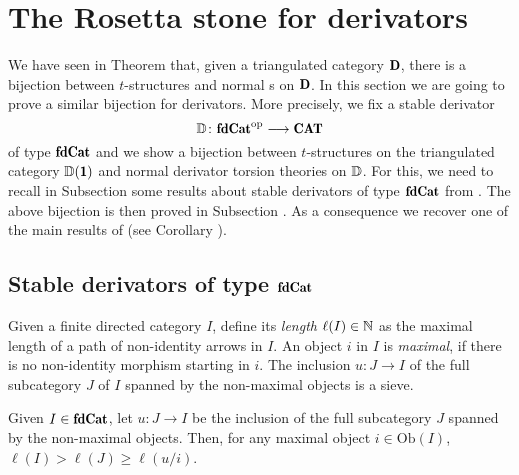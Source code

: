 \section{The Rosetta stone for derivators}
We have seen in Theorem  that, given a triangulated category $\cD$, there is a bijection between $t$-structures and normal {\htth}s on $\cD$. In this section we are going to prove a similar bijection for derivators. More precisely, we fix a stable derivator 
$$\D\colon \fincat^\opp\longrightarrow \Cat$$
of type $\fincat$ and we show a bijection between $t$-structures on the triangulated category $\D(\uno)$ and normal derivator torsion theories on $\mathbb{D}$. For this, we need to recall in Subsection  some results about stable derivators of type $\fincat$ from \cite{Groth_Virili}. The above bijection is then proved in Subsection . As a consequence we recover one of the main results of \cite{Fiorenza2014} (see Corollary ). 

\subsection{Stable derivators of type $\fincat$}\label{recall_fincat}

Given a finite directed category $I$, define its \emph{length} $\ell(I)\in \mathbb{N}$ as the maximal length of a path of non-identity arrows in $I$. An object $i$ in $I$ is \emph{maximal}, if there is no non-identity morphism starting in $i$. The inclusion $u\colon J\to I$ of the full subcategory $J$ of $I$ spanned by the non-maximal objects is a sieve.

\begin{lemma}{\rm \cite{Groth_Virili}}
Given $I\in\fincat$, let $u\colon J\to I$ be the inclusion of the full subcategory $J$ spanned by the non-maximal objects. Then, for any maximal object $i\in \mathrm{Ob}(I)$, $\ell(I)>\ell(J)\geq \ell(u/i)$.
\end{lemma}


